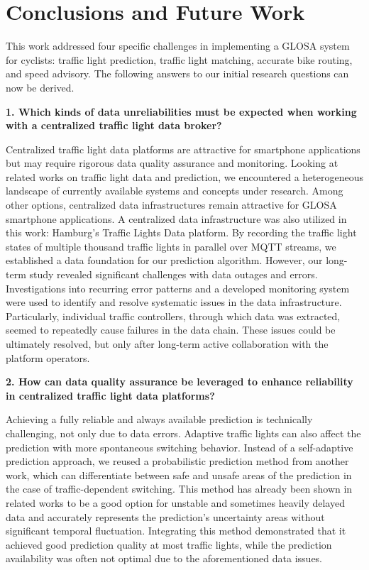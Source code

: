 \chapter{Conclusions and Future Work}\label{ch:conclusions}

This work addressed four specific challenges in implementing a GLOSA system for cyclists: traffic light prediction, traffic light matching, accurate bike routing, and speed advisory. The following answers to our initial research questions can now be derived.

\textbf{\color{cidarkblue}1. Which kinds of data unreliabilities must be expected when working with a centralized traffic light data broker?} 

Centralized traffic light data platforms are attractive for smartphone applications but may require rigorous data quality assurance and monitoring. Looking at related works on traffic light data and prediction, we encountered a heterogeneous landscape of currently available systems and concepts under research. Among other options, centralized data infrastructures remain attractive for GLOSA smartphone applications. A centralized data infrastructure was also utilized in this work: Hamburg's Traffic Lights Data platform. By recording the traffic light states of multiple thousand traffic lights in parallel over MQTT streams, we established a data foundation for our prediction algorithm. However, our long-term study revealed significant challenges with data outages and errors. Investigations into recurring error patterns and a developed monitoring system were used to identify and resolve systematic issues in the data infrastructure. Particularly, individual traffic controllers, through which data was extracted, seemed to repeatedly cause failures in the data chain. These issues could be ultimately resolved, but only after long-term active collaboration with the platform operators.

\textbf{\color{cidarkblue}2. How can data quality assurance be leveraged to enhance reliability in centralized traffic light data platforms?} 

Achieving a fully reliable and always available prediction is technically challenging, not only due to data errors. Adaptive traffic lights can also affect the prediction with more spontaneous switching behavior. Instead of a self-adaptive prediction approach, we reused a probabilistic prediction method from another work, which can differentiate between safe and unsafe areas of the prediction in the case of traffic-dependent switching. This method has already been shown in related works to be a good option for unstable and sometimes heavily delayed data and accurately represents the prediction's uncertainty areas without significant temporal fluctuation. Integrating this method demonstrated that it achieved good prediction quality at most traffic lights, while the prediction availability was often not optimal due to the aforementioned data issues.

